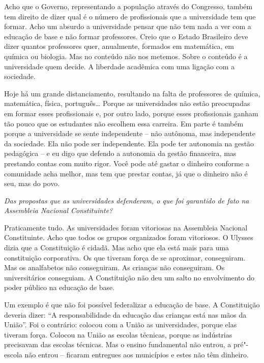 Acho que o Governo, representando a população através do Congresso,
também tem direito de dizer qual é o número de profissionais que a
universidade tem que formar. Acho um absurdo a universidade pensar que
não tem nada a ver com a educação de base e não formar professores.
Creio que o Estado Brasileiro deve dizer quantos professores quer,
anualmente, formados em matemática, em química ou biologia. Mas no
conteúdo não nos metemos. Sobre o conteúdo é a universidade quem decide.
A liberdade acadêmica com uma ligação com a sociedade.

Hoje há um grande distanciamento, resultando na falta de professores de
química, matemática, física, português\ldots{} Porque as universidades não
estão preocupadas em formar esses profissionais e, por outro lado,
porque esses profissionais ganham tão pouco que os estudantes não
escolhem essa carreira. Em parte é também porque a universidade se sente
independente -- não autônoma, mas independente da sociedade. Ela não
pode ser independente. Ela pode ter autonomia na gestão pedagógica -- e
eu digo que defendo a autonomia da gestão financeira, mas prestando
contas com muito rigor. Você pode até gastar o dinheiro conforme a
comunidade acha melhor, mas tem que prestar contas, já que o dinheiro
não é seu, mas do povo.

\medskip

\noindent\emph{Das propostas que as universidades defenderam, o que foi
garantido de fato na Assembleia Nacional Constituinte?}

Praticamente tudo. As universidades foram vitoriosas
na Assembleia Nacional Constituinte. Acho que todos os grupos
organizados foram vitoriosos. O Ulysses dizia que a Constituição é
cidadã. Mas acho que ela está mais para uma constituição corporativa. Os
que tiveram força de se aproximar, conseguiram. Mas os analfabetos não
conseguiram. As crianças não conseguiram. Os universitários conseguiam.
A Constituição não deu um salto no envolvimento do poder público na
educação de base.

Um exemplo é que não foi possível federalizar a educação de base. A
Constituição deveria dizer: ``A responsabilidade da educação das
crianças está nas mãos da União''. Foi o contrário: colocou com a União
as universidades, porque elas tiveram força. Colocou na União as escolas
técnicas, porque as indústrias precisavam das escolas técnicas. Mas o
ensino fundamental não entrou, a pré"-escola não entrou -- ficaram
entregues aos municípios e estes não têm dinheiro.

\medskip

